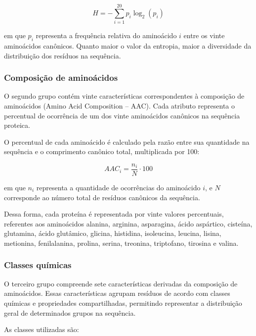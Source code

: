 \begin{equation}
H = -\sum_{i=1}^{20} p_i \log_2(p_i)
\end{equation}

em que $p_i$ representa a frequência relativa do aminoácido $i$ entre os vinte aminoácidos canônicos. Quanto maior o valor da entropia, maior a diversidade da distribuição dos resíduos na sequência.

\subsubsection{Composição de aminoácidos}

O segundo grupo contém vinte características correspondentes à composição de aminoácidos (Amino Acid Composition -- AAC). Cada atributo representa o percentual de ocorrência de um dos vinte aminoácidos canônicos na sequência proteica.

O percentual de cada aminoácido é calculado pela razão entre sua quantidade na sequência e o comprimento canônico total, multiplicada por 100:

\begin{equation}
AAC_i = \frac{n_i}{N} \cdot 100
\end{equation}

em que $n_i$ representa a quantidade de ocorrências do aminoácido $i$, e $N$ corresponde ao número total de resíduos canônicos da sequência.

Dessa forma, cada proteína é representada por vinte valores percentuais, referentes aos aminoácidos alanina, arginina, asparagina, ácido aspártico, cisteína, glutamina, ácido glutâmico, glicina, histidina, isoleucina, leucina, lisina, metionina, fenilalanina, prolina, serina, treonina, triptofano, tirosina e valina.

\subsubsection{Classes químicas}

O terceiro grupo compreende sete características derivadas da composição de aminoácidos. Essas características agrupam resíduos de acordo com classes químicas e propriedades compartilhadas, permitindo representar a distribuição geral de determinados grupos na sequência.

As classes utilizadas são:

